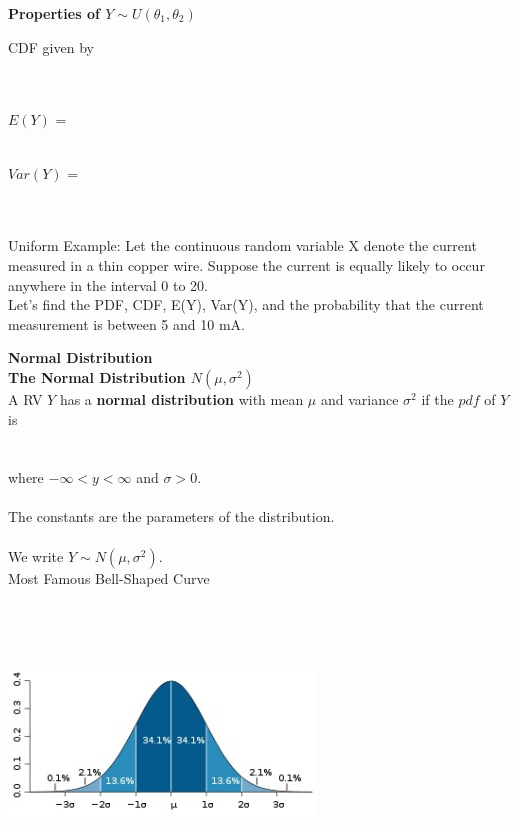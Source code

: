 \textbf{Properties of $Y \sim U(\theta_1,\theta_2)$}
\be
\item CDF given by\\~\\~\\
\item $E(Y)$ =  \underbar{~~~~~~~~~~~~~~~~~~~~~~~~~~~~~~~~~~~} \\~\\
\item $Var(Y)$ =  \underbar{~~~~~~~~~~~~~~~~~~~~~~~~~~~~~~~~~~~}\\~\\~\\
\ee

Uniform Example:  Let the continuous random variable X denote the current measured in a thin copper wire.  Suppose the current is equally likely to occur anywhere in the interval 0 to 20.  \\
Let's find the PDF, CDF, E(Y), Var(Y), and the probability that the current measurement is between 5 and 10 mA.
\pagebreak

\huge \textbf{Normal Distribution}\normalsize\\
\textbf{The Normal Distribution $N(\mu,\sigma^2)$}\\
A RV $Y$ has a \textbf{normal distribution} with mean $\mu$ and variance $\sigma^2$ if the $pdf$ of $Y$ is\\~\\~\\
where $-\infty < y < \infty$ and $\sigma>0$.\\~\\
The constants  \underbar{~~~~~~~~~~~~~~~~~~~~~~~~~~~~~~~~~~~~~~}  are the parameters of the distribution.\\~\\
We write $Y \sim N(\mu, \sigma^2)$.\\
Most Famous Bell-Shaped Curve\\~\\
\begin{center}
\includegraphics[height=2.5in,width=3.2in]{normaldistribution.jpg}
\end{center}



